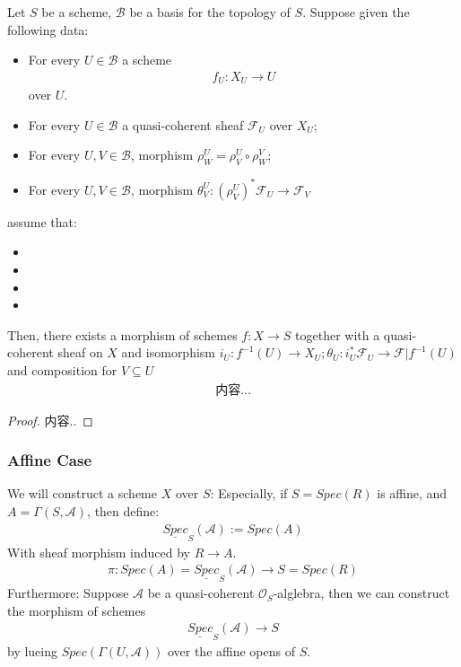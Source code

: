 \documentclass[Total.tex]{subfiles}
\begin{document}
					
					\begin{lemma}
						Let $S$ be a scheme, $\mathcal{B}$ be a basis for the topology of $S$. Suppose given the following data:
						\begin{itemize}
							\item For every $U\in \mathcal{B}$ a scheme
							\begin{gather*}
								f_U:X_U\rightarrow U 
							\end{gather*}
							over $U$.
							\item For every $U\in \mathcal{B}$ a quasi-coherent sheaf $\mathcal{F}_U$ over $X_U$;
							\item For every $U,V\in \mathcal{B}$, morphism $\rho^U_W=\rho^U_V\circ \rho^V_W$;
							\item For every $U,V\in \mathcal{B}$, morphism $\theta^U_V:(\rho^U_V)^*\mathcal{F}_U\rightarrow \mathcal{F}_V$
						\end{itemize}
						assume that:
						\begin{itemize}
							\item 
							\item 
							\item 
							\item 
						\end{itemize}
						Then, there exists a morphism of schemes $f:X\rightarrow S$ together with a quasi-coherent sheaf on $X$ and isomorphism $i_U:f^{-1}(U)\rightarrow X_U;\theta_U:i^*_U\mathcal{F}_U\rightarrow \mathcal{F}|f^{-1}(U)$ and composition for $V\subseteq U$
						\begin{gather*}
							内容...
						\end{gather*}
					\end{lemma}
					\begin{proof}
						内容..
					\end{proof}
				\subsubsection{Affine Case}
				We will construct a scheme $X$ over $S$: Especially, if $S=Spec(R)$ is affine, and $A=\Gamma(S,\mathcal{A})$, then define:
				\begin{gather*}
					\underline{Spec}_S(\mathcal{A}):=Spec(A)
				\end{gather*} 
				With sheaf morphism induced by $R\rightarrow A$.
				\begin{gather*}
					\pi:Spec(A)=\underline{Spec}_S(\mathcal{A})\rightarrow S=Spec(R)
				\end{gather*}
				Furthermore: Suppose $\mathcal{A}$ be a quasi-coherent $\mathcal{O}_S$-alglebra, then we can construct the morphism of schemes
				\begin{gather*}
					\underline{Spec}_S(\mathcal{A})\rightarrow S
				\end{gather*}
				by lueing $Spec(\Gamma(U,\mathcal{A}))$ over the affine opens of $S$.
			
\end{document}
